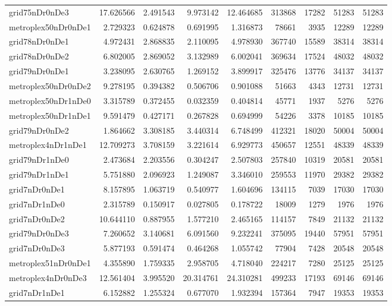 \documentclass[../../../thesis.tex]{subfiles}
\begin{document}
\begin{longtable}{|l|r|r|r|r|r|r|r|r|}
grid75nDr0nDe3 & 17.626566 & 2.491543 & 9.973142 & 12.464685 & 313868 & 17282 & 51283 & 51283 \\
metroplex50nDr0nDe1 & 2.729323 & 0.624878 & 0.691995 & 1.316873 & 78661 & 3935 & 12289 & 12289 \\
grid78nDr0nDe1 & 4.972431 & 2.868835 & 2.110095 & 4.978930 & 367740 & 15589 & 38314 & 38314 \\
grid78nDr0nDe2 & 6.802005 & 2.869052 & 3.132989 & 6.002041 & 369634 & 17524 & 48032 & 48032 \\
grid79nDr0nDe1 & 3.238095 & 2.630765 & 1.269152 & 3.899917 & 325476 & 13776 & 34137 & 34137 \\
metroplex50nDr0nDe2 & 9.278195 & 0.394382 & 0.506706 & 0.901088 & 51663 & 4343 & 12731 & 12731 \\
metroplex50nDr1nDe0 & 3.315789 & 0.372455 & 0.032359 & 0.404814 & 45771 & 1937 & 5276 & 5276 \\
metroplex50nDr1nDe1 & 9.591479 & 0.427171 & 0.267828 & 0.694999 & 54226 & 3378 & 10185 & 10185 \\
grid79nDr0nDe2 & 1.864662 & 3.308185 & 3.440314 & 6.748499 & 412321 & 18020 & 50004 & 50004 \\
metroplex4nDr1nDe1 & 12.709273 & 3.708159 & 3.221614 & 6.929773 & 450657 & 12551 & 48339 & 48339 \\
grid79nDr1nDe0 & 2.473684 & 2.203556 & 0.304247 & 2.507803 & 257840 & 10319 & 20581 & 20581 \\
grid79nDr1nDe1 & 5.751880 & 2.096923 & 1.249087 & 3.346010 & 259553 & 11970 & 29382 & 29382 \\
grid7nDr0nDe1 & 8.157895 & 1.063719 & 0.540977 & 1.604696 & 134115 & 7039 & 17030 & 17030 \\
grid7nDr1nDe0 & 2.315789 & 0.150917 & 0.027805 & 0.178722 & 18009 & 1279 & 1976 & 1976 \\
grid7nDr0nDe2 & 10.644110 & 0.887955 & 1.577210 & 2.465165 & 114157 & 7849 & 21132 & 21132 \\
grid79nDr0nDe3 & 7.260652 & 3.140681 & 6.091560 & 9.232241 & 375095 & 19440 & 57951 & 57951 \\
grid7nDr0nDe3 & 5.877193 & 0.591474 & 0.464268 & 1.055742 & 77904 & 7428 & 20548 & 20548 \\
metroplex51nDr0nDe1 & 4.355890 & 1.759335 & 2.958705 & 4.718040 & 224217 & 7280 & 25125 & 25125 \\
metroplex4nDr0nDe3 & 12.561404 & 3.995520 & 20.314761 & 24.310281 & 499233 & 17193 & 69146 & 69146 \\
grid7nDr1nDe1 & 6.152882 & 1.255324 & 0.677070 & 1.932394 & 157364 & 7947 & 19353 & 19353 \\

\end{longtable}
\end{document}
